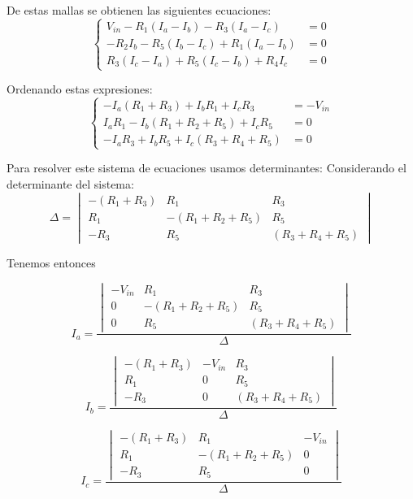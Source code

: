 \documentclass[12pt,a4paper]{article}
\begin{document}
De estas mallas se obtienen las siguientes ecuaciones:
\[
\left\{
\begin{aligned}
	V_{in} - R_1 (I_a - I_b) - R_3 (I_a - I_c) &= 0 \\
	-R_2 I_b - R_5 (I_b - I_c) + R_1 (I_a - I_b) &= 0 \\
	R_3 (I_c - I_a) + R_5 (I_c - I_b) + R_4 I_c &= 0
\end{aligned}
\right.
\]

Ordenando estas expresiones:
\[\left\{
\begin{aligned}
	-I_a (R_1 + R_3) + I_b R_1 + I_c R_3 &= -V_{in} \\
	I_a R_1 - I_b (R_1 + R_2 + R_5) + I_c R_5 &= 0 \\
	-I_a R_3 + I_b R_5 + I_c (R_3 + R_4 + R_5) &= 0
\end{aligned}\right.
\]

Para resolver este sistema de ecuaciones usamos determinantes:
Considerando el determinante del sistema:
\begin{equation}
	\Delta = \begin{vmatrix}
		-(R_1 + R_3) & R_1 & R_3 \\
		R_1 & -(R_1 + R_2 + R_5) & R_5 \\
		-R_3 & R_5 & (R_3 + R_4 + R_5)
	\end{vmatrix}
\end{equation}

Tenemos entonces

\begin{equation}
	I_a = \frac{\begin{vmatrix}
		-V_{in} & R_1 & R_3 \\
		0 & -(R_1 + R_2 + R_5) & R_5 \\
		0 & R_5 & (R_3 + R_4 + R_5)
	\end{vmatrix}}{\Delta}
\end{equation}

\begin{equation}
	I_b = \frac{\begin{vmatrix}
		-(R_1 + R_3) & -V_{in} & R_3 \\
		R_1 & 0 & R_5 \\
		-R_3 & 0 & (R_3 + R_4 + R_5)
	\end{vmatrix}}{\Delta}
\end{equation}

\begin{equation}
	I_c = \frac{\begin{vmatrix}
		-(R_1 + R_3) & R_1 & -V_{in} \\
		R_1 & -(R_1 + R_2 + R_5) & 0 \\
		-R_3 & R_5 & 0
	\end{vmatrix}}{\Delta}
\end{equation}
\end{document}
